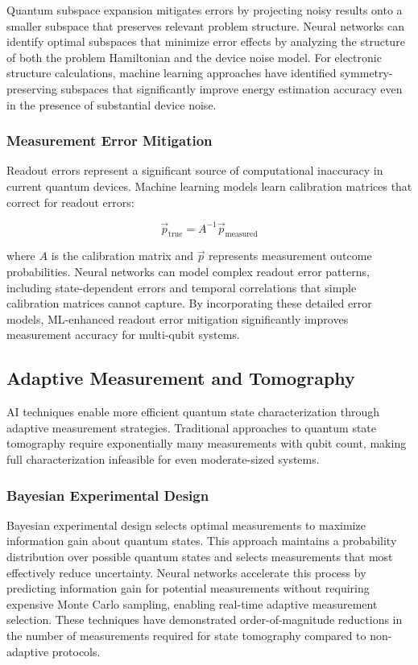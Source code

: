 Quantum subspace expansion mitigates errors by projecting noisy results onto a smaller subspace that preserves relevant problem structure. Neural networks can identify optimal subspaces that minimize error effects by analyzing the structure of both the problem Hamiltonian and the device noise model. For electronic structure calculations, machine learning approaches have identified symmetry-preserving subspaces that significantly improve energy estimation accuracy even in the presence of substantial device noise.

\subsubsection{Measurement Error Mitigation}

Readout errors represent a significant source of computational inaccuracy in current quantum devices. Machine learning models learn calibration matrices that correct for readout errors:

\begin{equation}
\vec{p}_{\text{true}} = A^{-1} \vec{p}_{\text{measured}}
\end{equation}

where $A$ is the calibration matrix and $\vec{p}$ represents measurement outcome probabilities. Neural networks can model complex readout error patterns, including state-dependent errors and temporal correlations that simple calibration matrices cannot capture. By incorporating these detailed error models, ML-enhanced readout error mitigation significantly improves measurement accuracy for multi-qubit systems.

\subsection{Adaptive Measurement and Tomography}

AI techniques enable more efficient quantum state characterization through adaptive measurement strategies. Traditional approaches to quantum state tomography require exponentially many measurements with qubit count, making full characterization infeasible for even moderate-sized systems.

\subsubsection{Bayesian Experimental Design}

Bayesian experimental design selects optimal measurements to maximize information gain about quantum states. This approach maintains a probability distribution over possible quantum states and selects measurements that most effectively reduce uncertainty. Neural networks accelerate this process by predicting information gain for potential measurements without requiring expensive Monte Carlo sampling, enabling real-time adaptive measurement selection. These techniques have demonstrated order-of-magnitude reductions in the number of measurements required for state tomography compared to non-adaptive protocols.

